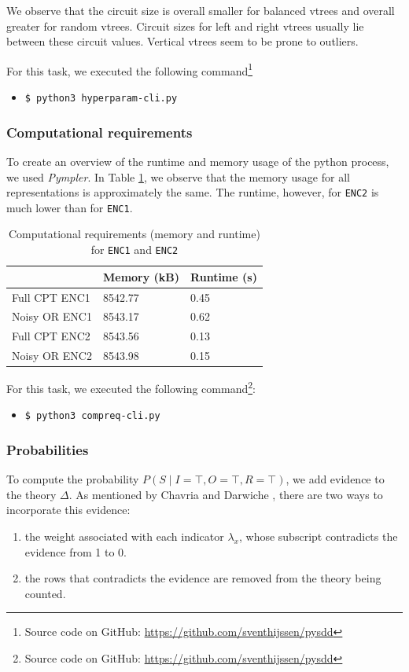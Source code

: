 \documentclass{article}
\begin{document}
We observe that the circuit size is overall smaller for balanced vtrees and overall greater for random vtrees. Circuit sizes for left and right  vtrees usually lie between these circuit values. Vertical vtrees seem to be prone to outliers.

For this task, we executed the following command\footnote{Source code on GitHub: \href{https://github.com/sventhijssen/pysdd}{https://github.com/sventhijssen/pysdd}}
\begin{itemize}
	\item[] \texttt{\$ python3 hyperparam-cli.py}
\end{itemize}

\newpage

\subsubsection{Computational requirements}
To create an overview of the runtime and memory usage of the python process, we used \textit{Pympler}. In Table \ref{tab:memory_runtime}, we observe that the memory usage for all representations is approximately the same. The runtime, however, for \texttt{ENC2} is much lower than for \texttt{ENC1}.

\begin{table}[h]
\centering
\begin{tabular}{l | l l}
					&	Memory (kB)	&	Runtime (s)	\\\hline
	Full CPT ENC1	&	8542.77		&	0.45			\\
	Noisy OR ENC1	&	8543.17		&	0.62			\\
	Full CPT ENC2	&	8543.56		&	0.13			\\
	Noisy OR ENC2	&	8543.98		&	0.15			\\
\end{tabular}
\caption{Computational requirements (memory and runtime) for \texttt{ENC1} and \texttt{ENC2}}
\label{tab:memory_runtime}
\end{table}

For this task, we executed the following command\footnote{Source code on GitHub: \href{https://github.com/sventhijssen/pysdd}{https://github.com/sventhijssen/pysdd}}:
\begin{itemize}
	\item[] \texttt{\$ python3 compreq-cli.py}
\end{itemize}

\subsubsection{Probabilities}
To compute the probability $P(S \mid I=\top, O = \top, R = \top)$, we add evidence to the theory $\Delta$. As mentioned by Chavria and Darwiche \cite{chavira}, there are two ways to incorporate this evidence:
\begin{enumerate}
	\item the weight associated with each indicator $\lambda_x$, whose subscript contradicts the evidence from 1 to 0.
	\item the rows that contradicts the evidence are removed from the theory being counted.
\end{enumerate}
\end{document}
